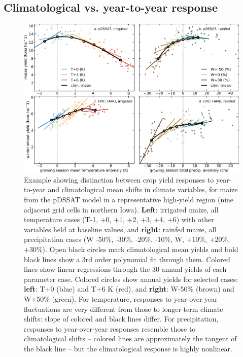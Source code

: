 \documentclass[gmd, manuscript]{copernicus} %
\begin{document}
\subsection{Climatological vs. year-to-year response}
\begin{figure}[ht]
\centering
   \includegraphics[width=15cm]{figures/phase_II_em_figure_1.png}
   \caption{
	   Example showing distinction between crop yield responses to year-to-year and climatological mean shifts in climate variables, for  
       maize from the pDSSAT model in a representative high-yield region (nine adjacent grid cells in northern Iowa). 	\textbf{Left}: irrigated maize, all temperature cases (T-1, +0, +1, +2, +3, +4, +6) with other variables held at baseline values, and \textbf{right}: rainfed maize, all precipitation cases (W -50\%, -30\%, -20\%, -10\%, W, +10\%, +20\%, +30\%).
       Open black circles mark climatological mean yields and bold black lines show a 3rd order polynomial fit through them. Colored lines show linear regressions through the 30 annual yields of each parameter case. Colored circles show annual yields for selected cases:
       \textbf{left}: T+0 (blue) and T+6 K (red), and \textbf{right}: W-50\% (brown) and W+50\% (green).
       For temperature, responses to year-over-year fluctuations are very different from those to longer-term climate shifts: slope of colored and black lines differ. For precipitation, responses to year-over-year responses resemble those to climatological shifts -- colored lines are approximately the tangent of the black line -- but the climatological response is highly nonlinear. 
   }
   \label{fig:yearvclim}
\end{figure}
\end{document}
